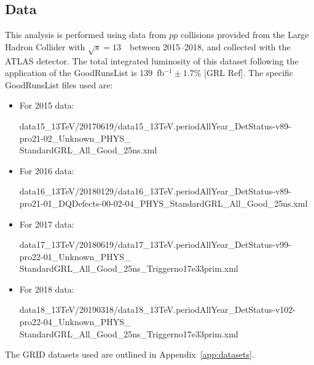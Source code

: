 \subsection{Data}

This analysis is performed using data from $pp$ collisions provided from the Large Hadron Collider with $\sqrt{s} = 13$~\TeV~between 2015--2018, and collected with the ATLAS detector. The total integrated luminosity of this dataset following the application of the GoodRunsList is 139~fb$^{-1}\pm1.7\%$ [GRL Ref]. The specific GoodRunsList files used are:

\begin{itemize}
    \item For 2015 data:

    data15\_13TeV/20170619/data15\_13TeV.periodAllYear\_DetStatus-v89-pro21-02\_Unknown\_PHYS\_\\
    StandardGRL\_All\_Good\_25ns.xml
    \item For 2016 data:

    data16\_13TeV/20180129/data16\_13TeV.periodAllYear\_DetStatus-v89-pro21-01\_DQDefects-00-02-04\_PHYS\_StandardGRL\_All\_Good\_25ns.xml
    \item For 2017 data:

    data17\_13TeV/20180619/data17\_13TeV.periodAllYear\_DetStatus-v99-pro22-01\_Unknown\_PHYS\_ \\
    StandardGRL\_All\_Good\_25ns\_Triggerno17e33prim.xml
    \item For 2018 data:

    data18\_13TeV/20190318/data18\_13TeV.periodAllYear\_DetStatus-v102-pro22-04\_Unknown\_PHYS\_ \\
    StandardGRL\_All\_Good\_25ns\_Triggerno17e33prim.xml
\end{itemize}

The GRID datasets used are outlined in Appendix~\ref{app:datasets}.

